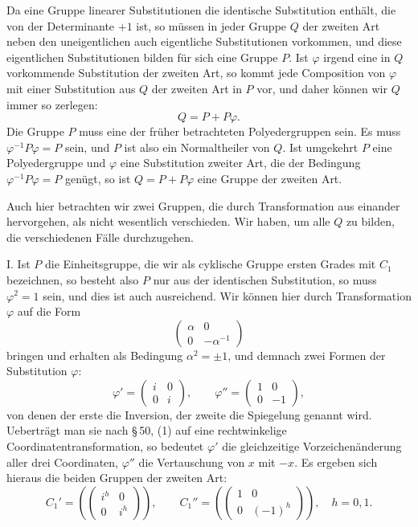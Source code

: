 \documentclass[11pt]{article}
\begin{document}
Da eine Gruppe linearer Substitutionen die identische Substitution enthält, die von der Determinante $+1$ ist, so müssen in jeder Gruppe $Q$ der zweiten Art neben den uneigentlichen auch eigentliche Substitutionen vorkommen, und diese eigentlichen Substitutionen bilden für sich eine Gruppe $P$. Ist $\varphi$ irgend eine in $Q$ vorkommende Substitution der zweiten Art, so kommt jede Composition von $\varphi$ mit einer Substitution aus $Q$ der zweiten Art in $P$ vor, und daher können wir $Q$ immer so zerlegen:
\begin{equation}
 Q=P+P\varphi . \tag{1}
\end{equation}
Die Gruppe $P$ muss eine der früher betrachteten Polyedergruppen sein. Es muss $\varphi^{-1}P\varphi=P$ sein, und $P$ ist also ein Normaltheiler von $Q$. Ist umgekehrt $P$ eine Polyedergruppe und $\varphi$ eine Substitution zweiter Art, die der Bedingung $\varphi^{-1}P\varphi=P$ genügt, so ist $Q=P+P\varphi$ eine Gruppe der zweiten Art.

Auch hier betrachten wir zwei Gruppen, die durch Transformation aus einander hervorgehen, als nicht wesentlich verschieden. Wir haben, um alle $Q$ zu bilden, die verschiedenen Fälle durchzugehen.

I. Ist $P$ die Einheitsgruppe, die wir als cyklische Gruppe ersten Grades mit $C_1$ bezeichnen, so besteht also $P$ nur aus der identischen Substitution, so muss $\varphi^2=1$ sein, und dies ist auch ausreichend. Wir können hier durch Transformation $\varphi$ auf die Form
\[
 \begin{pmatrix}\alpha&0\\0&-\alpha^{-1}\end{pmatrix}
\]
bringen und erhalten als Bedingung $\alpha^2=\pm1$, und demnach zwei Formen der Substitution $\varphi$:
\[
 \varphi'=\begin{pmatrix}i&0\\0&i\end{pmatrix},\qquad
 \varphi''=\begin{pmatrix}1&0\\0&-1\end{pmatrix},
\]
von denen der erste die Inversion, der zweite die Spiegelung genannt wird. Ueberträgt man sie nach \S\,50, (1) auf eine rechtwinkelige Coordinatentransformation, so bedeutet $\varphi'$ die gleichzeitige Vorzeichenänderung aller drei Coordinaten, $\varphi''$ die Vertauschung von $x$ mit $-x$. Es ergeben sich hieraus die beiden Gruppen der zweiten Art:
\begin{equation}
 C_1'=\left(\begin{pmatrix}i^h&0\\0&i^h\end{pmatrix}\right),\qquad
 C_1''=\left(\begin{pmatrix}1&0\\0&(-1)^h\end{pmatrix}\right),
 \quad h=0,1. \tag{2}
\end{equation}
\end{document}
